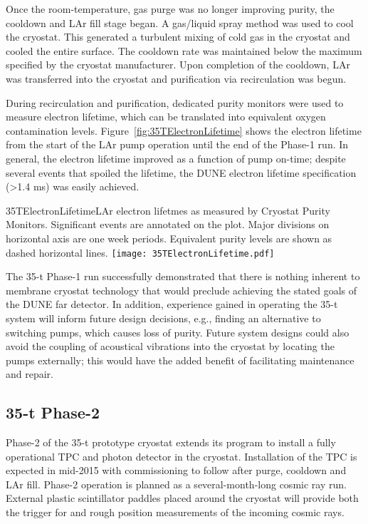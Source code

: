 Once the room-temperature, gas purge was no longer improving purity,
the cooldown and LAr fill stage began.
A gas/liquid spray method was used to cool the cryostat.
This generated a turbulent mixing of cold gas in the cryostat and cooled the entire surface.
The cooldown rate was maintained below the maximum specified by the cryostat manufacturer.
Upon completion of the cooldown, LAr was transferred into the cryostat and %
purification via recirculation was begun. 

During recirculation and purification, dedicated purity monitors were used to measure electron lifetime, which can
be translated into equivalent oxygen contamination levels.
Figure~\ref{fig:35TElectronLifetime} shows the electron lifetime from the start of the
LAr pump operation until the end of the Phase-1 run.
In general, the electron lifetime improved as a function of pump
on-time; despite %
several events that spoiled the lifetime, %
the DUNE electron lifetime
specification (>1.4 ms) was easily achieved.

\begin{cdrfigure}{35TElectronLifetime}{LAr electron lifetmes as measured by
Cryostat Purity Monitors. Significant events are annotated on the plot. Major divisions on horizontal axis
are one week periods. Equivalent purity levels are shown as dashed horizontal lines.}
\texttt{[image: 35TElectronLifetime.pdf]}
\end{cdrfigure}

The 35-t Phase-1 run successfully demonstrated that there is nothing %
inherent to
membrane cryostat technology that would preclude achieving the stated goals of the
DUNE far detector. In addition, experience gained in operating the 35-t system
will inform future design decisions, e.g., finding an alternative to switching pumps, which
causes loss of purity.  %
Future system
designs could also avoid the coupling of acoustical vibrations into the cryostat by %
locating the pumps externally; this would have the added benefit of facilitating
maintenance and repair. 

\subsection{35-t Phase-2}
Phase-2 of the 35-t prototype cryostat extends its program %
to install %
a fully operational TPC and
photon detector in the %
cryostat.
Installation of the TPC is expected in mid-2015 with commissioning to follow
after purge, cooldown and LAr fill.  Phase-2 operation is planned as a several-month-long
cosmic ray run.  External plastic scintillator paddles placed around the cryostat will provide
both the trigger for and rough position measurements of the incoming cosmic rays.

